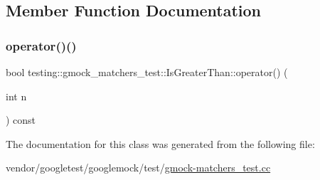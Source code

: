 \subsection{Member Function Documentation}
\mbox{\label{classtesting_1_1gmock__matchers__test_1_1_is_greater_than_a34b455148a2d299c654bc4443db0af67}} 
\subsubsection{\texorpdfstring{operator()()}{operator()()}}
{\footnotesize\ttfamily bool testing\+::gmock\+\_\+matchers\+\_\+test\+::\+Is\+Greater\+Than\+::operator() (\begin{DoxyParamCaption}\item[{int}]{n }\end{DoxyParamCaption}) const\hspace{0.3cm}{\ttfamily [inline]}}



The documentation for this class was generated from the following file\+:\begin{DoxyCompactItemize}
\item 
vendor/googletest/googlemock/test/\hyperlink{gmock-matchers__test_8cc}{gmock-\/matchers\+\_\+test.\+cc}\end{DoxyCompactItemize}
